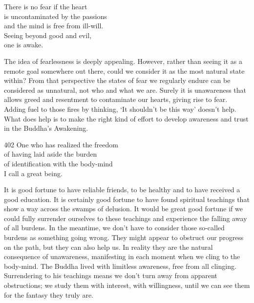 
\begin{dhpVerse}{39}
\label{dhp-39}
There is no fear if the heart\\
is uncontaminated by the passions\\
and the mind is free from ill-will.\\
Seeing beyond good and evil,\\
one is awake.
\end{dhpVerse}

\begin{dhpRefl}
  The idea of fearlessness is deeply appealing. However, rather than seeing it
  as a remote goal somewhere out there, could we consider it as the most natural
  state within? From that perspective the states of fear we regularly endure can
  be considered as unnatural, not who and what we are. Surely it is unawareness
  that allows greed and resentment to contaminate our hearts, giving rise to
  fear. Adding fuel to those fires by thinking, ‘It shouldn’t be this way’
  doesn’t help. What does help is to make the right kind of effort to develop
  awareness and trust in the Buddha's Awakening.
\end{dhpRefl}


\begin{dhpVerse}{402}
\label{dhp-402}
One who has realized the freedom\\
of having laid aside the burden\\
of identification with the body-mind\\
I call a great being.
\end{dhpVerse}

\begin{dhpRefl}
  It is good fortune to have reliable friends, to be healthy and to have
  received a good education. It is certainly good fortune to have found
  spiritual teachings that show a way across the swamps of delusion. It would be
  great good fortune if we could fully surrender ourselves to these teachings
  and experience the falling away of all burdens. In the meantime, we don't have
  to consider those so-called burdens as something going wrong. They might
  appear to obstruct our progress on the path, but they can also help us. In
  reality they are the natural consequence of unawareness, manifesting in each
  moment when we cling to the body-mind. The Buddha lived with limitless
  awareness, free from all clinging. Surrendering to his teachings means we
  don’t turn away from apparent obstructions; we study them with interest, with
  willingness, until we can see them for the fantasy they truly are.
\end{dhpRefl}

